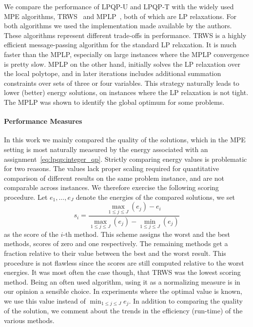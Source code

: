 We compare the performance of \acs{LPQP-U} and \acs{LPQP-T} with the widely 
used \ac{MPE} algorithms, \ac{TRWS}~\parencite{Kolmogorov2006} and
\ac{MPLP}~\parencite{Sontag2008},
both of which are \ac{LP} relaxations. For both algorithms we used the 
implementation made available by the authors. These algorithms represent 
different trade-offs in performance. \ac{TRWS} is a highly efficient 
message-passing algorithm for the standard \ac{LP} relaxation. It is much 
faster than the \ac{MPLP}, especially on large instances where the \ac{MPLP} 
convergence is pretty slow. \ac{MPLP} on the other hand, initially solves
the \ac{LP} relaxation over the local polytope, and in later iterations 
includes additional summation constraints over sets of three or four variables. 
This strategy naturally leads to lower (better) energy solutions, on
instances where the \ac{LP} relaxation is not tight. The \ac{MPLP} was shown to 
identify the global optimum for some problems.

\paragraph{Performance Measures}

In this work we mainly compared the quality of the solutions, 
which in the \ac{MPE} setting is most naturally measured by the energy associated
with an assignment~\eqref{eq:lpqp:integer_qp}.
Strictly comparing energy values is problematic for two reasons.
The values lack proper scaling required for quantitative 
comparison of different results on the same problem instance, and are not 
comparable across instances. 
We therefore exercise the following scoring procedure. Let $e_1,\ldots ,e_J$
denote the energies of the compared solutions, we set 
\begin{equation}
    s_i = \frac{\max_{1 \leq j \leq J}(e_j) - e_i}{\max_{1 \leq j \leq J}(e_j)
    - \min_{1 \leq j \leq J}(e_j)}
    \label{eq:lpqp:performance_measure}
\end{equation}
as the score of the $i$-th method. 
This scheme assigns the worst and the best methods, scores of
zero and one respectively. The remaining methods get a fraction 
relative to their value between the best and the worst result.
This procedure is not flawless since the scores are still computed relative 
to the worst energies. It was most often the case though, that 
\ac{TRWS} was the lowest scoring method. Being an often used algorithm,
using it as a normalizing measure is in our opinion a
sensible 
choice. In experiments where the optimal value is known,
we use this value instead of $\min_{1 \leq j \leq J}e_j$.
In addition to comparing the quality of the solution, we comment about the 
trends in the efficiency (run-time) of the various methods. 

